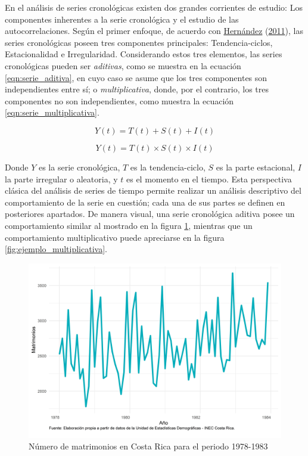 \documentclass[
]{article}
\begin{document}
En el análisis de series cronológicas existen dos grandes corrientes de
estudio: Los componentes inherentes a la serie cronológica y el estudio
de las autocorrelaciones. Según el primer enfoque, de acuerdo con
\protect\hyperlink{ref-oscarh-1}{Hernández}
(\protect\hyperlink{ref-oscarh-1}{2011}), las series cronológicas poseen
tres componentes principales: Tendencia-ciclos, Estacionalidad e
Irregularidad. Considerando estos tres elementos, las series
cronológicas pueden ser \emph{aditivas}, como se muestra en la ecuación
\ref{eqn:serie_aditiva}, en cuyo caso se asume que los tres componentes
son independientes entre sí; o \emph{multiplicativa}, donde, por el
contrario, los tres componentes no son independientes, como muestra la
ecuación \ref{eqn:serie_multiplicativa}.

\begin{equation}
\label{eqn:serie_aditiva}
Y(t)=T(t)+S(t)+I(t)
\end{equation}

\begin{equation}
\label{eqn:serie_multiplicativa}
Y(t)=T(t)\times S(t)\times I(t)
\end{equation}

Donde \(Y\) es la serie cronológica, \(T\) es la tendencia-ciclo, \(S\)
es la parte estacional, \(I\) la parte irregular o aleatoria, y \(t\) es
el momento en el tiempo. Esta perspectiva clásica del análisis de series
de tiempo permite realizar un análisis descriptivo del comportamiento de
la serie en cuestión; cada una de sus partes se definen en posteriores
apartados. De manera visual, una serie cronológica aditiva posee un
comportamiento similar al mostrado en la figura
\ref{fig:ejemplo_aditiva}, mientras que un comportamiento multiplicativo
puede apreciarse en la figura \ref{fig:ejemplo_multiplicativa}.

\begin{figure}[!h]
\includegraphics[width=1\linewidth,height=1\textheight]{Tesis_files/figure-latex/ejemplo_aditiva-1} \caption{Número de matrimonios en Costa Rica para el periodo 1978-1983}\label{fig:ejemplo_aditiva}
\end{figure}
\end{document}
